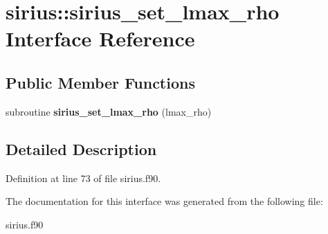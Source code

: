 \hypertarget{interfacesirius_1_1sirius__set__lmax__rho}{}\section{sirius\+:\+:sirius\+\_\+set\+\_\+lmax\+\_\+rho Interface Reference}
\label{interfacesirius_1_1sirius__set__lmax__rho}
\subsection*{Public Member Functions}
\begin{DoxyCompactItemize}
\item 
\hypertarget{interfacesirius_1_1sirius__set__lmax__rho_a6ef4a8ac5299448d75e31e6d465be84b}{}subroutine {\bfseries sirius\+\_\+set\+\_\+lmax\+\_\+rho} (lmax\+\_\+rho)\label{interfacesirius_1_1sirius__set__lmax__rho_a6ef4a8ac5299448d75e31e6d465be84b}

\end{DoxyCompactItemize}


\subsection{Detailed Description}


Definition at line 73 of file sirius.\+f90.



The documentation for this interface was generated from the following file\+:\begin{DoxyCompactItemize}
\item 
sirius.\+f90\end{DoxyCompactItemize}

